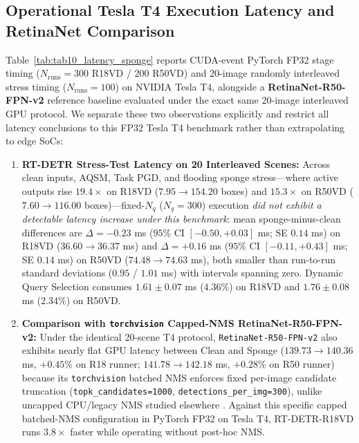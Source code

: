 \documentclass[preprint,10pt]{elsarticle}
\begin{document}
\subsection{Operational Tesla T4 Execution Latency and RetinaNet Comparison}
\label{sec:hardware_latency}
Table~\ref{tab:tab10_latency_sponge} reports CUDA-event PyTorch FP32 stage timing ($N_{\mathrm{runs}} = 300$ R18VD / $200$ R50VD) and 20-image randomly interleaved stress timing ($N_{\mathrm{runs}} = 100$) on NVIDIA Tesla T4, alongside a \textbf{RetinaNet-R50-FPN-v2} reference baseline evaluated under the exact same 20-image interleaved GPU protocol. We separate these two observations explicitly and restrict all latency conclusions to this FP32 Tesla T4 benchmark rather than extrapolating to edge SoCs:
\begin{enumerate}
    \item \textbf{RT-DETR Stress-Test Latency on 20 Interleaved Scenes:} Across clean inputs, AQSM, Task PGD, and flooding sponge stress---where active outputs rise $19.4\times$ on R18VD ($7.95 \to 154.20$ boxes) and $15.3\times$ on R50VD ($7.60 \to 116.00$ boxes)---fixed-$N_q$ ($N_q = 300$) execution \textit{did not exhibit a detectable latency increase under this benchmark}: mean sponge-minus-clean differences are $\Delta = -0.23$ ms ($95\%$ CI $[-0.50, +0.03]$ ms; SE $0.14$ ms) on R18VD ($36.60 \to 36.37$ ms) and $\Delta = +0.16$ ms ($95\%$ CI $[-0.11, +0.43]$ ms; SE $0.14$ ms) on R50VD ($74.48 \to 74.63$ ms), both smaller than run-to-run standard deviations ($0.95$ / $1.01$ ms) with intervals spanning zero. Dynamic Query Selection consumes $1.61 \pm 0.07$ ms ($4.36\%$) on R18VD and $1.76 \pm 0.08$ ms ($2.34\%$) on R50VD.
    \item \textbf{Comparison with \texttt{torchvision} Capped-NMS RetinaNet-R50-FPN-v2:} Under the identical 20-scene T4 protocol, \texttt{RetinaNet-R50-FPN-v2} also exhibits nearly flat GPU latency between Clean and Sponge ($139.73 \to 140.36$ ms, $+0.45\%$ on R18 runner; $141.78 \to 142.18$ ms, $+0.28\%$ on R50 runner) because its \texttt{torchvision} batched NMS enforces fixed per-image candidate truncation (\texttt{topk\_candidates=1000}, \texttt{detections\_per\_img=300}), unlike uncapped CPU/legacy NMS studied elsewhere \citep{shumailov2021sponge, chen2024overload, shapira2023phantom}. Against this specific capped batched-NMS configuration in PyTorch FP32 on Tesla T4, RT-DETR-R18VD runs $3.8\times$ faster while operating without post-hoc NMS.
\end{enumerate}
\end{document}
